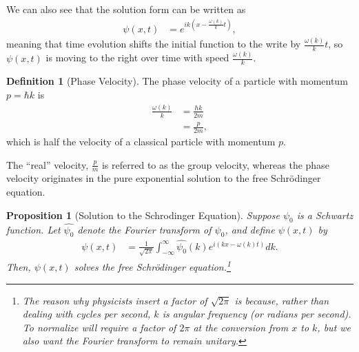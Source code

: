 \documentclass[12pt]{extarticle}
\theoremstyle{plain}
\newtheorem*{proposition}{Proposition}%
\theoremstyle{definition}
\newtheorem*{definition}{Definition}
\theoremstyle{remark}
\begin{document}
  We can also see that the solution form can be written as
  \begin{align*}
    \psi(x,t) &= e^{ik\left(x - \frac{\omega(k)}{k}t\right)},
  \end{align*}
  meaning that time evolution shifts the initial function to the write by $\frac{\omega(k)}{k}t$, so $\psi(x,t)$ is moving to the right over time with speed $\frac{\omega(k)}{k}$.
  \begin{definition}[Phase Velocity]
    The phase velocity of a particle with momentum $p = \hbar k$ is
    \begin{align*}
      \frac{\omega(k)}{k} &= \frac{\hbar k}{2m}\\
                          &= \frac{p}{2m},
    \end{align*}
    which is half the velocity of a classical particle with momentum $p$.
  \end{definition}
  The ``real'' velocity, $\frac{p}{m}$ is referred to as the group velocity, whereas the phase velocity originates in the pure exponential solution to the free Schrödinger equation.
  \begin{proposition}[Solution to the Schrodinger Equation]
    Suppose $\psi_0$ is a Schwartz function. Let $\hat{\psi_0}$ denote the Fourier transform of $\psi_0$, and define $\psi(x,t)$ by
    \begin{align*}
      \psi(x,t) &= \frac{1}{\sqrt{2\pi}}\int_{-\infty}^{\infty}\hat{\psi_0}(k)e^{i\left(kx - \omega(k)t\right)}dk.
    \end{align*}
    Then, $\psi(x,t)$ solves the free Schrödinger equation.\footnote{The reason why physicists insert a factor of $\sqrt{2\pi}$ is because, rather than dealing with cycles per second, $k$ is angular frequency (or radians per second). To normalize will require a factor of $2\pi$ at the conversion from $x$ to $k$, but we also want the Fourier transform to remain unitary.}
  \end{proposition}
\end{document}
